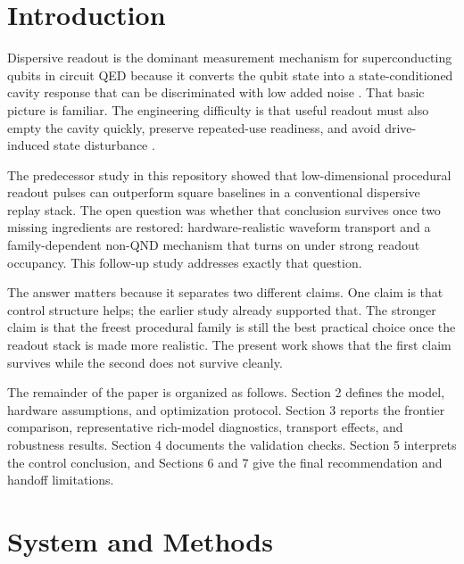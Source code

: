 \documentclass[11pt, a4paper]{article}
\begin{document}
\section{Introduction}
Dispersive readout is the dominant measurement mechanism for superconducting qubits in
circuit QED because it converts the qubit state into a state-conditioned cavity response
that can be discriminated with low added noise \cite{blais2021circuit,koch2007transmon}.
That basic picture is familiar. The engineering difficulty is that useful readout must
also empty the cavity quickly, preserve repeated-use readiness, and avoid drive-induced
state disturbance \cite{jeffrey2014fast,mcclure2016rapid,sank2016measurement}.

The predecessor study in this repository showed that low-dimensional procedural readout
pulses can outperform square baselines in a conventional dispersive replay stack. The open
question was whether that conclusion survives once two missing ingredients are restored:
hardware-realistic waveform transport and a family-dependent non-QND mechanism that turns
on under strong readout occupancy. This follow-up study addresses exactly that question.

The answer matters because it separates two different claims. One claim is that control
structure helps; the earlier study already supported that. The stronger claim is that the
freest procedural family is still the best practical choice once the readout stack is made
more realistic. The present work shows that the first claim survives while the second does
not survive cleanly.

The remainder of the paper is organized as follows. Section 2 defines the model, hardware
assumptions, and optimization protocol. Section 3 reports the frontier comparison,
representative rich-model diagnostics, transport effects, and robustness results.
Section 4 documents the validation checks. Section 5 interprets the control conclusion,
and Sections 6 and 7 give the final recommendation and handoff limitations.

\section{System and Methods}
\end{document}
